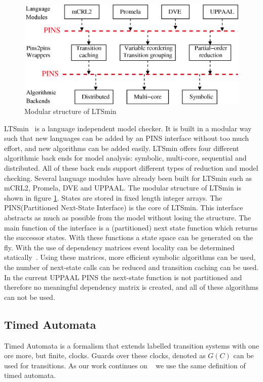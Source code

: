 \documentclass[11pt]{article}
\begin{document}
\begin{figure}[t] 
\includegraphics[width=\textwidth]{pins_modern}
\caption{Modular structure of LTSmin}
\label{fig:pins_modern}
\end{figure}

LTSmin~\cite{eemcs18152,ltsmin-mc:nmf2011} is a language independent model checker. It is built in a modular way such that new languages can be added by an PINS interface without too much effort, and new algorithms can be added easily. LTSmin offers four different algorithmic back ends for model analysis: symbolic, multi-core, sequential and distributed. All of these back ends support different types of reduction and model checking. Several language modules have already been built for LTSmin such as mCRL2, Promela, DVE and UPPAAL. The modular structure of LTSmin is shown in figure \ref{fig:pins_modern}. States are stored in fixed length integer arrays. The PINS(Partitioned Next-State Interface) is the core of LTSmin. This interface abstracts as much as possible from the model without losing the structure. The main function of the interface is a (partitioned) next state function which returns the successor states. With these functions a state space can be generated on the fly. With the use of dependency matrices event locality can be determined statically~\cite{rwcmatrices}. Using these matrices, more efficient symbolic algorithms can be used, the number of next-state calls can be reduced and transition caching can be used. In the current UPPAAL PINS the next-state function is not partitioned and therefore no meaningful dependency matrix is created, and all of these algorithms can not be used.

\subsection{Timed Automata}
Timed Automata is a formalism that extends labelled transition systems with one ore more, but finite, clocks. Guards over these clocks, denoted as $G(C)$ can be used for transitions. As our work continues on ~\cite{eemcs21972} we use the same definition of timed automata.
\end{document}
